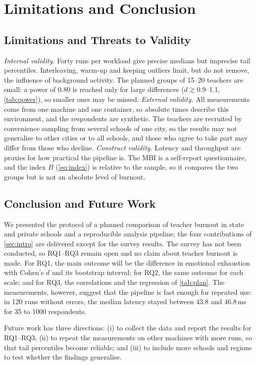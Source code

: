 \section{Limitations and Conclusion}\label{sec:concl}

\subsection{Limitations and Threats to Validity}\label{sec:limits}
\textit{Internal validity.} Forty runs per workload give precise medians but
imprecise tail percentiles. Interleaving, warm-up and keeping outliers limit,
but do not remove, the influence of background activity. The planned groups of
15--20 teachers are small: a power of 0.80 is reached only for large differences
($d \gtrsim 0.9$--1.1, \autoref{tab:power}), so smaller ones may be missed.
\textit{External validity.} All measurements come from one machine and one
container, so absolute times describe this environment, and the respondents are
synthetic. The teachers are recruited by convenience sampling from several
schools of one city, so the results may not generalise to other cities or to
all schools, and those who agree to take part may differ from those who decline.
\textit{Construct validity.} Latency and throughput are proxies for how practical
the pipeline is. The MBI is a self-report questionnaire, and the index $B$
(\autoref{eq:index}) is relative to the sample, so it compares the two groups
but is not an absolute level of burnout.

\subsection{Conclusion and Future Work}\label{sec:future}
We presented the protocol of a planned comparison of teacher burnout in state
and private schools and a reproducible analysis pipeline; the four contributions
of \autoref{sec:intro} are delivered except for the survey results. The survey has
not been conducted, so RQ1--RQ3 remain open and no claim about teacher burnout is
made. For RQ1, the main outcome will be the difference in emotional exhaustion with
Cohen's $d$ and its bootstrap interval; for RQ2, the same outcome for each scale;
and for RQ3, the correlations and the regression of \autoref{tab:plan}.
The measurements, however, suggest that the pipeline is fast enough for repeated
use: in 120 runs without errors, the median latency stayed between 43.8 and
46.8\,ms for 35 to 1000 respondents.

Future work has three directions: (i) to collect the data and report the results
for RQ1--RQ3; (ii) to repeat the measurements on other machines with more runs,
so that tail percentiles become reliable; and (iii) to include more schools and
regions to test whether the findings generalise.
